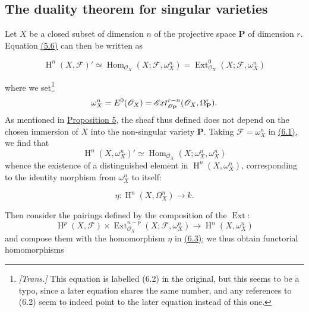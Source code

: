 \documentclass{article}
\newenvironment{eqenv}
  {}
  {}
\newcommand{\oldpage}[1]{\marginpar{\footnotesize$\Big\vert$ \textit{p.~#1}}}
\theoremstyle{definition}
\theoremstyle{definition}
\theoremstyle{definition}
\theoremstyle{definition}
\theoremstyle{remark}
\begin{document}
\hypertarget{fga-1-section-6}{%
\subsection{The duality theorem for singular varieties}\label{fga-1-section-6}}

Let \(X\) be a closed subset of dimension \(n\) of the projective space \(\mathbf{P}\) of dimension \(r\).
Equation \protect\hyperlink{fga-1-equation-5.6}{(5.6)} can then be written as

\leavevmode{}%
\begin{eqenv}
\[
  \operatorname{H}^n(X,{\mathscr{F}})'
  \simeq \operatorname{Hom}_{{\mathscr{O}}_X}(X;{\mathscr{F}},\omega_X^n)
  = \operatorname{Ext}_{{\mathscr{O}}_X}^0(X;{\mathscr{F}},\omega_X^n)
\tag{6.1}
\]

\end{eqenv}

where we set\footnote{\emph{{[}Trans.{]}} This equation is labelled (6.2) in the original, but this seems to be a typo, since a later equation shares the same number, and any references to (6.2) seem to indeed point to the later equation instead of this one.}
\[
  \omega_X^n = E^0({\mathscr{O}}_X) = \mathscr{E}\kern -.5pt xt_{{\mathscr{O}}_\mathbf{P}}^{r-n}({\mathscr{O}}_X,\Omega_\mathbf{P}^r).
\]
As mentioned in \protect\hyperlink{fga-1-proposition-5}{Proposition 5}, the sheaf thus defined does not depend on the chosen immersion of \(X\) into the non-singular variety \(\mathbf{P}\).
Taking \({\mathscr{F}}=\omega_X^n\) in \protect\hyperlink{fga-1-equation-6.1}{(6.1)}, we find that
\[
  \operatorname{H}^n(X,\omega_X^n)' \simeq \operatorname{Hom}_{{\mathscr{O}}_X}(X;\omega_X^n,\omega_X^n)
\tag{6.2}
\]
whence the existence of a distinguished element in \(\operatorname{H}^n(X,\omega_X^n)\), corresponding to the identity morphism from \(\omega_X^n\) to itself:

\leavevmode{}%
\begin{eqenv}
\[
  \eta\colon \operatorname{H}^n(X,\Omega_X^n) \to k.
\tag{6.3}
\]

\end{eqenv}

\oldpage{149-18}Then consider the pairings defined by the composition of the \(\operatorname{Ext}\):
\[
  \operatorname{H}^p(X,{\mathscr{F}}) \times \operatorname{Ext}_{{\mathscr{O}}_X}^{n-p}(X;{\mathscr{F}},\omega_X^n)
  \to \operatorname{H}^n(X,\omega_X^n)
\tag{6.4}
\]
and compose them with the homomorphism \(\eta\) in \protect\hyperlink{fga-1-equation-6.3}{(6.3)}; we thus obtain functorial homomorphisms
\end{document}
